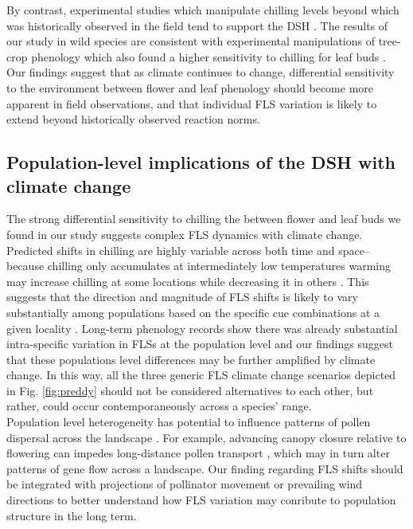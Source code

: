 \documentclass[11pt]{article}\usepackage[]{graphicx}\usepackage[]{color}
\begin{document}
{\noindent By contrast, experimental studies which manipulate chilling levels beyond which was historically observed in the field tend to support the DSH \citep[e.g.][]{Aslani2009,Gariglio2006}. The results of our study in wild species are consistent with experimental manipulations of tree-crop phenology which also found a higher sensitivity to chilling for leaf buds \citep{Gariglio2006,Citadin2001}. Our findings suggest that as climate continues to change, differential sensitivity to the environment between flower and leaf phenology should become more apparent in field observations, and that individual FLS variation is likely to extend beyond historically observed reaction norms.\\

\subsection*{Population-level implications of the DSH with climate change}
\noindent The strong differential sensitivity to chilling the between flower and leaf buds we found in our study suggests complex FLS dynamics with climate change. Predicted shifts in chilling are highly variable across both time and space-- because chilling only accumulates at intermediately low temperatures warming may increase chilling at some locations while decreasing it in others \citep{Man2017,Zhang:2007aa}. This suggests that the direction and magnitude of FLS shifts is likely to vary substantially among populations based on the specific cue combinations at a given locality \citep{Chmielewski:2012aa}. Long-term phenology records show there was already substantial intra-specific variation in FLSs at the population level \citep{Buonaiuto2020} and our findings suggest that these populations level differences may be further amplified by climate change. In this way, all the three generic FLS climate change scenarios depicted in Fig. \ref{fig:preddy} should not be considered alternatives to each other, but rather, could occur contemporaneously across a species' range. \\ 

\noindent Population level heterogeneity has potential to influence patterns of pollen dispersal across the landscape \citep{Borycka2017,Pace:2018aa}. For example, advancing canopy closure relative to flowering can impedes long-distance pollen transport \citep{Mileron2012}, which may in turn alter patterns of gene flow across a landscape. Our finding regarding FLS shifts should be integrated with projections of pollinator movement or prevailing wind directions \citep{Kling:2020aa} to better understand how FLS variation may conribute to population structure in the long term. \\

}
\end{document}
